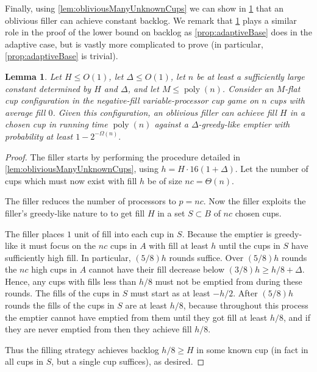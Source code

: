 \documentclass[twocolumn]{article}[10pt]
\DeclareMathOperator{\poly}{\text{poly}}
\newtheorem{lemma}{Lemma}
\begin{document}
Finally, using \cref{lem:obliviousManyUnknownCups} we can show in
\cref{lem:obliviousBase} that an oblivious filler can achieve
constant backlog. We remark that \cref{lem:obliviousBase} plays a
similar role in the proof of the lower bound on backlog as
\cref{prop:adaptiveBase} does in the adaptive case, but is vastly
more complicated to prove (in particular,
\cref{prop:adaptiveBase} is trivial).
\begin{lemma}
  \label{lem:obliviousBase}
  Let $H \le O(1)$, let $\Delta \le O(1)$, let $n$ be at
  least a sufficiently large constant determined by $H$ and
  $\Delta$, and let $M \le \poly(n)$. 
  Consider an $M$-flat cup configuration in the negative-fill variable-processor cup
  game on $n$ cups with average fill $0$.
  Given this configuration, an oblivious filler can achieve fill $H$
  in a chosen cup in running time $\poly(n)$ against a
  $\Delta$-greedy-like emptier with probability at least $1-2^{-\Omega(n)}.$
\end{lemma}
\begin{proof}
  The filler starts by performing the procedure detailed in
  \ref{lem:obliviousManyUnknownCups}, using $h = H\cdot
  16(1+\Delta)$. Let the number of cups which must now exist with
  fill $h$ be of size $nc = \Theta(n)$.

  The filler reduces the number of processors to $p=nc$. 
  Now the filler exploits the filler's greedy-like nature to
  to get fill $H$ in a set $S\subset B$ of $nc$ chosen cups.

  The filler places $1$ unit of fill into each cup in $S$.
  Because the emptier is greedy-like it must focus on the $nc$
  cups in $A$ with fill at least $h$ until the cups in $S$ have
  sufficiently high fill. In particular, $(5/8)h$ rounds suffice.
  Over $(5/8)h$ rounds the $nc$ high cups in $A$ cannot have
  their fill decrease below $(3/8)h \ge h/8 + \Delta$. Hence, any
  cups with fills less than $h/8$ must not be emptied from during
  these rounds. The fills of the cups in $S$ must start
  as at least $-h/2$. After $(5/8)h$ rounds the fills of the cups
  in $S$ are at least $h/8$, because throughout this process the
  emptier cannot have emptied from them until they got fill at
  least $h/8$, and if they are never emptied from then they
  achieve fill $h/8$.

  Thus the filling strategy achieves backlog $h/8 \ge H$ in some
  known cup (in fact in all cups in $S$, but a single cup
  suffices), as desired.

\end{proof}
\end{document}
